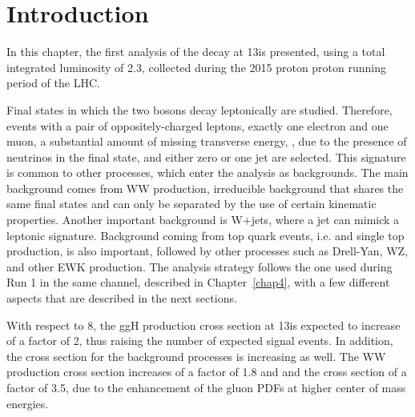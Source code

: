\section{Introduction}\label{sec:chap5_introduction}

In this chapter, the first analysis of the \hww decay at 13\TeV is presented, using a total integrated luminosity of 2.3\ifb,
collected during the 2015 proton proton running period of the LHC.

Final states in which the two \W bosons decay leptonically are studied.
Therefore, events with a pair of oppositely-charged leptons,
exactly one electron and one muon, a substantial amount of missing transverse energy, \MET, 
due to the presence of neutrinos in the final state, and either zero or one jet are selected. 
This signature is common to other processes, which enter the analysis as backgrounds.
The main background comes from WW production, irreducible background that shares the same final states and can only 
be separated by the use of certain kinematic properties.
Another important background is W+jets, where a jet can mimick a leptonic signature.
Background coming from top quark events, i.e. \ttbar and single top production, is also important, 
followed by other processes such as Drell-Yan, WZ, and other EWK production.
The analysis strategy follows the one used during Run 1 in the same channel, described in Chapter~\ref{chap4}, with a few different aspects that are described in the next sections.

With respect to 8\TeV, the ggH production cross section at 13\TeV is expected to increase of a factor of 2, thus raising the number of expected signal events. In addition, the cross section for the background processes is increasing as well. The WW production cross section increases of a factor of 1.8 and and the \ttbar cross section of a factor of 3.5, due to the enhancement of the gluon PDFs at higher center of mass energies. 
